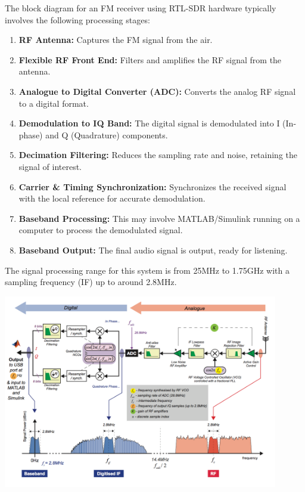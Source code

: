 The block diagram for an FM receiver using RTL-SDR hardware typically involves the following processing stages:
\begin{enumerate}
    \item \textbf{RF Antenna:} Captures the FM signal from the air.
    \item \textbf{Flexible RF Front End:} Filters and amplifies the RF signal from the antenna.
    \item \textbf{Analogue to Digital Converter (ADC):} Converts the analog RF signal to a digital format.
    \item \textbf{Demodulation to IQ Band:} The digital signal is demodulated into I (In-phase) and Q (Quadrature) components.
    \item \textbf{Decimation Filtering:} Reduces the sampling rate and noise, retaining the signal of interest.
    \item \textbf{Carrier \& Timing Synchronization:} Synchronizes the received signal with the local reference for accurate demodulation.
    \item \textbf{Baseband Processing:} This may involve MATLAB/Simulink running on a computer to process the demodulated signal.
    \item \textbf{Baseband Output:} The final audio signal is output, ready for listening.
\end{enumerate}
The signal processing range for this system is from 25MHz to 1.75GHz with a sampling frequency (IF) up to around 2.8MHz.
\begin{center}
    \includegraphics[width=0.9\textwidth]{imgs/rtl-sdr.png}
\end{center}

